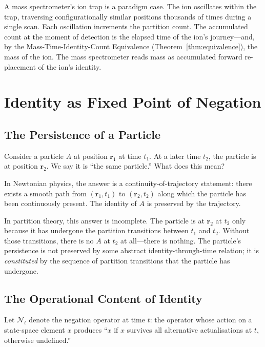 \documentclass[twocolumn,10pt,a4paper]{article}
\theoremstyle{definition}
\theoremstyle{remark}
\newcommand{\Negation}{\mathcal{N}}
\begin{document}
A mass spectrometer's ion trap is a paradigm case. The ion oscillates within the trap, traversing configurationally similar positions thousands of times during a single scan. Each oscillation increments the partition count. The accumulated count at the moment of detection is the elapsed time of the ion's journey---and, by the Mass-Time-Identity-Count Equivalence (Theorem~\ref{thm:equivalence}), the mass of the ion. The mass spectrometer reads mass as accumulated forward re-placement of the ion's identity.

\section{Identity as Fixed Point of Negation}
\label{sec:negation}

\subsection{The Persistence of a Particle}

Consider a particle $A$ at position $\mathbf{r}_1$ at time $t_1$. At a later time $t_2$, the particle is at position $\mathbf{r}_2$. We say it is ``the same particle.'' What does this mean?

In Newtonian physics, the answer is a continuity-of-trajectory statement: there exists a smooth path from $(\mathbf{r}_1, t_1)$ to $(\mathbf{r}_2, t_2)$ along which the particle has been continuously present. The identity of $A$ is preserved by the trajectory.

In partition theory, this answer is incomplete. The particle is at $\mathbf{r}_2$ at $t_2$ only because it has undergone the partition transitions between $t_1$ and $t_2$. Without those transitions, there is no $A$ at $t_2$ at all---there is nothing. The particle's persistence is not preserved by some abstract identity-through-time relation; it is \emph{constituted} by the sequence of partition transitions that the particle has undergone.

\subsection{The Operational Content of Identity}

Let $\Negation_t$ denote the negation operator at time $t$: the operator whose action on a state-space element $x$ produces ``$x$ if $x$ survives all alternative actualisations at $t$, otherwise undefined.''
\end{document}
